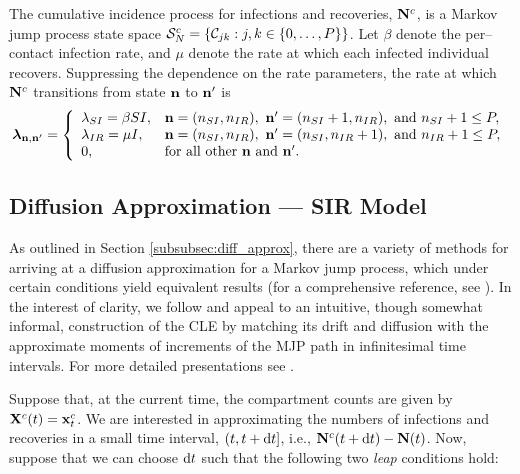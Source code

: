 The cumulative incidence process for infections and recoveries, $ \mathbf{N}^c $, is a Markov jump process state space {\small$ \mathcal{S}_N^c = \left \lbrace \mathcal{C}_{jk}:j,k\in\lbrace0,\dots,P\rbrace\right \rbrace $}. Let $ \beta $ denote the per--contact infection rate, and $ \mu $ denote the rate at which each infected individual recovers. Suppressing the dependence on the rate parameters, the rate at which $ \mathbf{N}^c $ transitions from state $ \mathbf{n} $ to $ \mathbf{n}^{\prime}$ is 
\begin{equation}
	\label{eqn:lna_sir_rates}
	\boldsymbol{\lambda}_{\mathbf{n},\mathbf{n}^\prime} = \left \lbrace \begin{array}{ll}
	\lambda_{SI} = \beta S I, & \mathbf{n} = (n_{SI},n_{IR}),\ \mathbf{n}^\prime = (n_{SI}+1,n_{IR}),\text{ and } n_{SI}+1\leq P, \\
	 \lambda_{IR} = \mu I, &  \mathbf{n} = (n_{SI},n_{IR}),\  \mathbf{n}^\prime = (n_{SI},n_{IR}+1),\text{ and } n_{IR}+1\leq P, \\
	 0, & \text{for all other } \mathbf{n} \text{ and } \mathbf{n}^\prime.
	\end{array} \right.
\end{equation}

\subsection{Diffusion Approximation --- SIR Model}
\label{subsec:diff_approx_sir}

As outlined in Section \ref{subsubsec:diff_approx}, there are a variety of methods for arriving at a diffusion approximation for a Markov jump process, which under certain conditions yield equivalent results (for a comprehensive reference, see \cite{fuchs2013inference}). In the interest of clarity, we follow \cite{fearnhead2014,golightly2013simulation,golightly2015delayed,wilkinson2011stochastic} and appeal to an intuitive, though somewhat informal, construction of the CLE by matching its drift and diffusion with the approximate moments of increments of the MJP path in infinitesimal time intervals. For more detailed presentations see \cite{fuchs2013inference,gillespie2000chemical,wallace2012linear}. 

Suppose that, at the current time, the compartment counts are given by $ \mathbf{X}^c(t) = \mathbf{x}^c_t $. We are interested in approximating the numbers of infections and recoveries in a small time interval, $ (t, t+\mathrm{d} t] $, i.e., $ \mathbf{N}^c(t+\mathrm{d} t) - \mathbf{N}(t)$. Now, suppose that we can choose $ \mathrm{d} t $ such that the following two \textit{leap} conditions hold:

